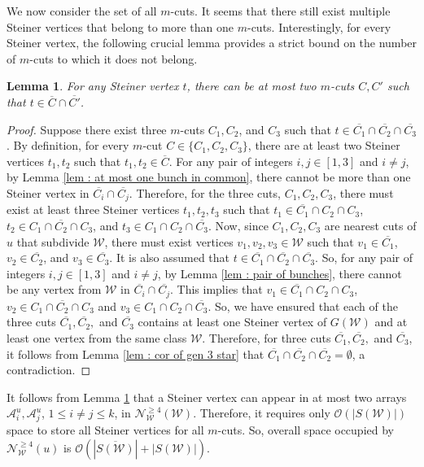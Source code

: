 \documentclass[letterpaper,11pt]{article}
\newtheorem{lemma}{Lemma}[]
\begin{document}
We now consider the set of all $m$-cuts. It seems that there still exist multiple Steiner vertices that belong to more than one $m$-cuts. Interestingly, for every Steiner vertex, the following crucial lemma provides a strict bound on the number of $m$-cuts to which it does not belong.
\begin{lemma} \label{lem : a bunch belong to at most two cuts}
    For any Steiner vertex $t$, there can be at most two $m$-cuts $C,C'$ such that $t\in \overline{C}\cap \overline{C'}$. 
\end{lemma}
\begin{proof}
    Suppose there exist three $m$-cuts $C_1,C_2$, and $C_3$ such that $t\in \overline{C_1}\cap \overline{C_2}\cap \overline{C_3}$. By definition, for every $m$-cut $C\in \{C_1,C_2,C_3\}$, there are at least two Steiner vertices $t_1,t_2$ such that $t_1,t_2\in \overline{C}$. For any pair of integers $i,j\in [1,3]$ and $i\ne j$, by Lemma \ref{lem : at most one bunch in common}, there cannot be more than one Steiner vertex in $\overline{C_i} \cap \overline{C_j}$. Therefore, for the three cuts, $C_1,C_2,C_3$, there must exist at least three Steiner vertices $t_1,t_2,t_3$ such that $t_1\in \overline{C_1}\cap C_2 \cap C_3$, $t_2\in C_1 \cap \overline{C_2}\cap C_3$, and $t_3\in C_1\cap C_2 \cap \overline{C_3}$. Now, since $C_1,C_2,C_3$ are nearest cuts of $u$ that subdivide ${\mathcal W}$, there must exist vertices $v_1,v_2,v_3\in {\mathcal W}$ such that $v_1\in \overline{C_1}$, $v_2\in \overline{C_2}$, and $v_3\in \overline{C_3}$. It is also assumed that $t\in \overline{C_1}\cap \overline{C_2}\cap \overline{C_3}$. So, for any pair of integers $i,j\in [1,3]$ and $i\ne j$, by Lemma \ref{lem : pair of bunches}, there cannot be any vertex from ${\mathcal W}$ in $\overline{C_i}\cap \overline{C_j}$.    
    This implies that $v_1\in \overline{C_1}\cap C_2\cap C_3$, $v_2\in C_1\cap \overline{C_2} \cap C_3$ and $v_3\in C_1\cap C_2\cap \overline{C_3}$. So, we have ensured that each of the three cuts $\overline{C_1},\overline{C_2},$ and $\overline{C_3}$ contains at least one Steiner vertex of $G({\mathcal W})$ and at least one vertex from the same class ${\mathcal W}$. Therefore, for three cuts $\overline{C_1}, \overline{C_2},$ and $\overline{C_3}$, it follows from Lemma \ref{lem : cor of gen 3 star} that $\overline{C_1}\cap \overline{C_2}\cap \overline{C_2}=\emptyset$, a contradiction.
\end{proof}



It follows from Lemma \ref{lem : a bunch belong to at most two cuts} that a Steiner vertex can appear in at most two arrays ${\mathcal A}_i^u, {\mathcal A}_j^u$, $1\le i\ne j \le k$, in ${\mathcal N}_{\mathcal W}^{\ge 4}({\mathcal W})$. Therefore, it requires only ${\mathcal O}(|S({\mathcal W})|)$ space to store all Steiner vertices for all $m$-cuts. So, overall space occupied by ${\mathcal N}_{\mathcal W}^{\ge 4}(u)$ is ${\mathcal O}(|\overline{S({\mathcal W})}|+|S({\mathcal W})|)$. \\
\end{document}
